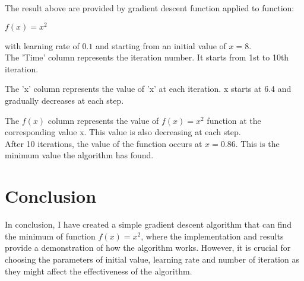 \documentclass{article}
\begin{document}
The result above are provided by gradient descent function applied to function:
\begin{center}
    $f(x) = x^2$
\end{center}
with learning rate of $0.1$ and starting from an initial value of $x = 8$.\\

The 'Time' column represents the iteration number. It starts from 1st to 10th iteration.

The 'x' column represents the value of 'x' at each iteration. x starts at 6.4 and gradually decreases at each step.

The $f(x)$ column represents the value of $f(x)=x^2$ function at the corresponding value x. This value is also decreasing at each step.\\

After 10 iterations, the value of the function occurs at $x = 0.86$. This is the minimum value the algorithm has found.

\section{Conclusion}

In conclusion, I have created a simple gradient descent algorithm that can find the minimum of function $f(x) = x^2$, where the implementation and results provide a demonstration of how the algorithm works. However, it is crucial for choosing the parameters of initial value, learning rate and number of iteration as they might affect the effectiveness of the algorithm.
\end{document}
